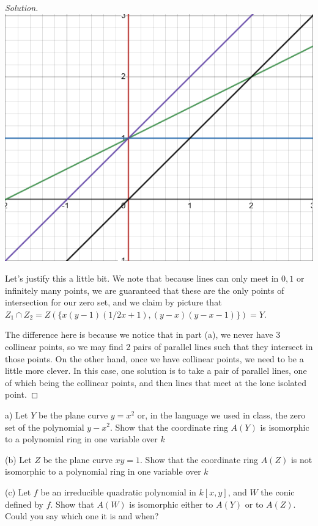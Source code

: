 \documentclass[10pt]{article}
\newenvironment{problem}[2][Problem]{\begin{trivlist}
\item[\hskip \labelsep {\bfseries #1}\hskip \labelsep {\bfseries #2.}]}{\end{trivlist}}
\begin{document}
\begin{proof}[Solution]
\begin{minipage}{0.30\linewidth}
\includegraphics[width=\linewidth]{both_lines}
\end{minipage}

Let's justify this a little bit. We note that because lines can only meet in $0,1$ or infinitely many points, we are guaranteed that these are the only points of intersection for our zero set, and we claim by picture that $ Z_1 \cap Z_2 = Z(\{x(y-1)(1/2x + 1),(y-x)(y-x-1)\}) = Y$.

The difference here is because we notice that in part (a), we never have 3 collinear points, so we may find 2 pairs of parallel lines such that they intersect in those points. On the other hand, once we have collinear points, we need to be a little more clever. In this case, one solution is to take a pair of parallel lines, one of which being the collinear points, and then lines that meet at the lone isolated point.


\end{proof}

\begin{problem}{2.4}

(a) Let $Y$ be the plane curve $y = x^2$ or, in the language we used in class, the zero set of the polynomial $y-x^2$. Show that the coordinate ring $A(Y)$ is isomorphic to a polynomial ring in one variable over $k$

(b) Let $Z$ be the plane curve $xy=1$. Show that the coordinate ring $A(Z)$ is not isomorphic to a polynomial ring in one variable over $k$

(c) Let $f$ be an irreducible quadratic polynomial in $k[x,y]$, and $W$ the conic defined by $f$. Show that $A(W)$ is isomorphic either to $A(Y)$ or to $A(Z)$. Could you say which one it is and when?

\end{problem}
\end{document}
